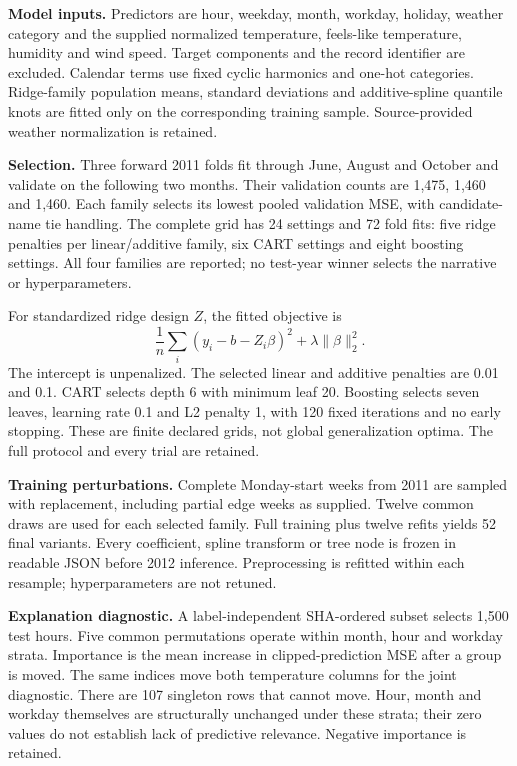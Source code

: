 \documentclass[11pt,letterpaper]{article}
\begin{document}
\textbf{Model inputs.} Predictors are hour, weekday, month, workday, holiday, weather category and the supplied normalized temperature, feels-like temperature, humidity and wind speed. Target components and the record identifier are excluded. Calendar terms use fixed cyclic harmonics and one-hot categories. Ridge-family population means, standard deviations and additive-spline quantile knots are fitted only on the corresponding training sample. Source-provided weather normalization is retained.

\textbf{Selection.} Three forward 2011 folds fit through June, August and October and validate on the following two months. Their validation counts are 1,475, 1,460 and 1,460. Each family selects its lowest pooled validation MSE, with candidate-name tie handling. The complete grid has 24 settings and 72 fold fits: five ridge penalties per linear/additive family, six CART settings and eight boosting settings. All four families are reported; no test-year winner selects the narrative or hyperparameters.

For standardized ridge design \(Z\), the fitted objective is
\[
 \frac{1}{n}\sum_i(y_i-b-Z_i\beta)^2+\lambda\|\beta\|_2^2.
\]
The intercept is unpenalized. The selected linear and additive penalties are 0.01 and 0.1. CART selects depth 6 with minimum leaf 20. Boosting selects seven leaves, learning rate 0.1 and L2 penalty 1, with 120 fixed iterations and no early stopping. These are finite declared grids, not global generalization optima. The full protocol and every trial are retained.

\textbf{Training perturbations.} Complete Monday-start weeks from 2011 are sampled with replacement, including partial edge weeks as supplied. Twelve common draws are used for each selected family. Full training plus twelve refits yields 52 final variants. Every coefficient, spline transform or tree node is frozen in readable JSON before 2012 inference. Preprocessing is refitted within each resample; hyperparameters are not retuned.

\textbf{Explanation diagnostic.} A label-independent SHA-ordered subset selects 1,500 test hours. Five common permutations operate within month, hour and workday strata. Importance is the mean increase in clipped-prediction MSE after a group is moved. The same indices move both temperature columns for the joint diagnostic. There are 107 singleton rows that cannot move. Hour, month and workday themselves are structurally unchanged under these strata; their zero values do not establish lack of predictive relevance. Negative importance is retained.
\end{document}
